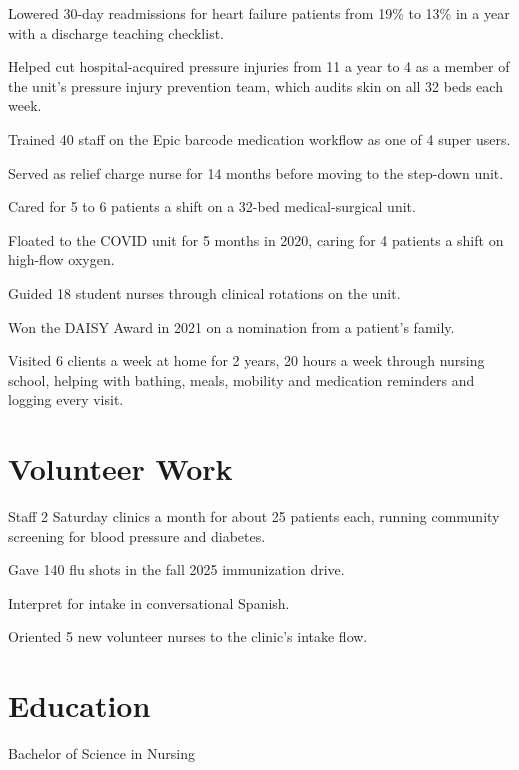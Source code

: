 \documentclass{resume}
\begin{document}
\begin{bullets}
  \item Lowered 30-day readmissions for heart failure patients from 19\% to 13\% in a year with a discharge teaching checklist.
  \item Helped cut hospital-acquired pressure injuries from 11 a year to 4 as a member of the unit's pressure injury prevention team, which audits skin on all 32 beds each week.
  \item Trained 40 staff on the Epic barcode medication workflow as one of 4 super users.
  \item Served as relief charge nurse for 14 months before moving to the step-down unit.
  \item Cared for 5 to 6 patients a shift on a 32-bed medical-surgical unit.
  \item Floated to the COVID unit for 5 months in 2020, caring for 4 patients a shift on high-flow oxygen.
  \item Guided 18 student nurses through clinical rotations on the unit.
  \item Won the DAISY Award in 2021 on a nomination from a patient's family.
\end{bullets}

\begin{bullets}
  \item Visited 6 clients a week at home for 2 years, 20 hours a week through nursing school, helping with bathing, meals, mobility and medication reminders and logging every visit.
\end{bullets}

\section{Volunteer Work}
\begin{bullets}
  \item Staff 2 Saturday clinics a month for about 25 patients each, running community screening for blood pressure and diabetes.
  \item Gave 140 flu shots in the fall 2025 immunization drive.
  \item Interpret for intake in conversational Spanish.
  \item Oriented 5 new volunteer nurses to the clinic's intake flow.
\end{bullets}

\section{Education}
  {Bachelor of Science in Nursing}{}
\end{document}
